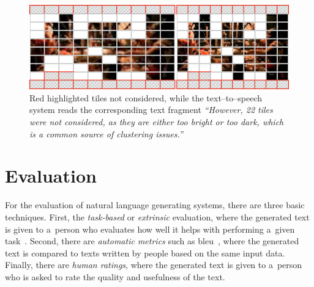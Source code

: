 \documentclass{article}
\begin{document}
\begin{figure}[t!]
  \centering
  \includegraphics[width=0.75\linewidth]{./tile-highlight.png}
  \caption{Red highlighted tiles not considered, while the text--to--speech system reads the corresponding text fragment \textit{``However, 22 tiles were not considered, as they are either too bright or too dark, which is a common source of clustering issues.''}}
  \label{fig:tile-highlight}
\end{figure}


\vspace{-0.5cm}
\section{Evaluation}
\label{sec:evaluation}
For the evaluation of natural language generating systems, there are three basic techniques. First, the \emph{task-based} or \emph{extrinsic} evaluation,
where the generated text is given to a~person who evaluates how well it helps with performing a~given task~\cite{portet2009nlg}. Second, there are \emph{automatic metrics} such as {\sc bleu}~\cite{papineni2002bleu}, where the generated text is compared to texts written by people based on the same input data. Finally, there are \emph{human ratings}, where the generated text is given to a~person who is asked to rate the quality and usefulness of the text.
\end{document}
